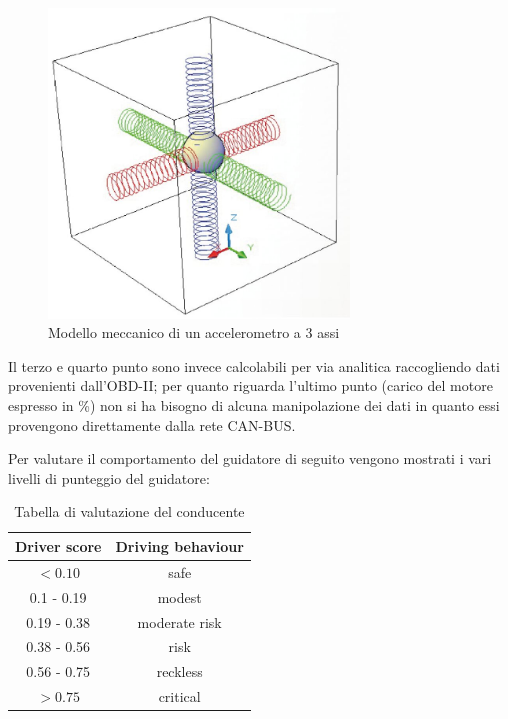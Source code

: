 \documentclass[12pt, a4paper, italian]{report}
\numberwithin{figure}{chapter}
\numberwithin{table}{chapter}
\begin{document}
\begin{figure}[h]
  \centering
  \includegraphics[width=8cm]{Accelerometro.jpg}
  \caption{Modello meccanico di un accelerometro a 3 assi}
  \label{fig:accelerometro}
\end{figure}

Il terzo e quarto punto sono invece calcolabili per via analitica raccogliendo dati provenienti dall'OBD-II; per quanto riguarda l'ultimo punto (carico del motore espresso in \%) non si ha bisogno di alcuna manipolazione dei dati in quanto essi provengono direttamente dalla rete CAN-BUS.

Per valutare il comportamento del guidatore di seguito vengono mostrati i vari livelli di punteggio del guidatore:

\begin{table}[h!]
  \centering
  \begin{tabular}{|c|c|}
    \hline
    \textbf{Driver score} & \textbf{Driving behaviour} \\
    \hline
    \(< 0.10\) & safe \\
    \hline
    0.1 - 0.19 & modest \\
    \hline
    0.19 - 0.38 & moderate risk \\
    \hline
    0.38 - 0.56 & risk \\
    \hline
     0.56 - 0.75 & reckless \\
    \hline
     \(> 0.75\) & critical \\
    \hline
  \end{tabular}
  \caption{Tabella di valutazione del conducente}
  \label{tab:tabellaValutativa}
\end{table}
\end{document}
